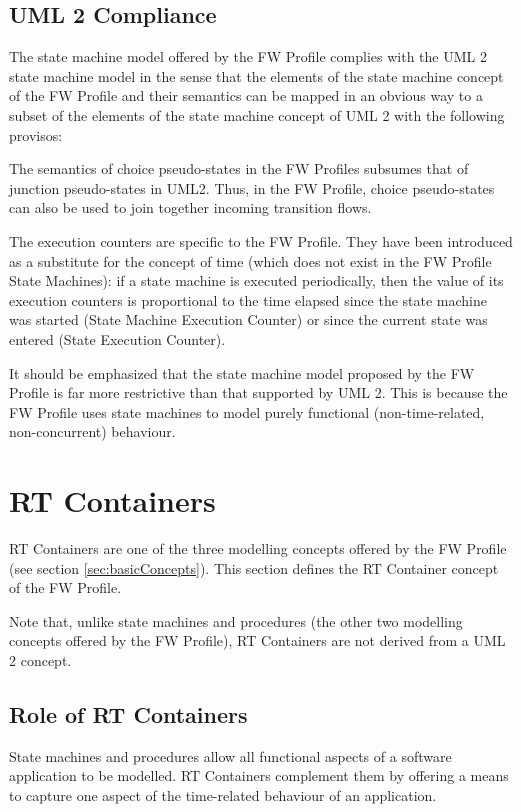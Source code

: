 \documentclass[definition]{../fwprofile}
\begin{document}
\subsection{UML 2 Compliance}
The state machine model offered by the FW Profile complies with the UML 2 state machine
model in the sense that the elements of the state machine concept of the FW Profile and their
semantics can be mapped in an obvious way to a subset of the elements of the state machine
concept of UML 2 with the following provisos:

\begin{fw_itemize}
\item The semantics of choice pseudo-states in the FW Profiles subsumes that of junction pseudo-states
in UML2. Thus, in the FW Profile, choice pseudo-states can also be used to join together incoming
transition flows.
\item The execution counters are specific to the FW Profile. They have been introduced as a
substitute for the concept of time (which does not exist in the FW Profile State Machines):
if a state machine is executed periodically, then the value of its execution 
counters is proportional to the time elapsed since the state machine was started (State Machine
Execution Counter) or since the current state was entered (State Execution Counter). 
\end{fw_itemize}

It should be emphasized that the state machine model proposed by the FW Profile is far more
restrictive than that supported by UML 2. This is because the FW Profile uses state machines
to model purely functional (non-time-related, non-concurrent) behaviour.

\newpage

\section{RT Containers}
RT Containers are one of the three modelling concepts offered by the FW Profile (see section
\ref{sec:basicConcepts}). This section defines the RT Container concept of the FW Profile.

Note that, unlike state machines and procedures (the other two modelling concepts offered by
the FW Profile), RT Containers are not derived from a UML 2 concept.

\subsection{Role of RT Containers}
State machines and procedures allow all functional aspects of a software application to be
modelled. RT Containers complement them by offering a means to capture one aspect of the
time-related behaviour of an application.
\end{document}

